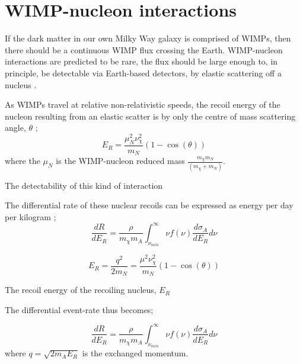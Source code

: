 \section{WIMP-nucleon interactions} \label{sec:wimp_nucleus_interactions}
\par
If the dark matter in our own Milky Way galaxy is comprised of WIMPs, then there should be a continuous WIMP flux crossing the Earth.
WIMP-nucleon interactions are predicted to be rare, the flux should be large enough to, in principle, be detectable via Earth-based detectors, by elastic scattering off a nucleus \cite{wimp_nucleon_interactions_first_suggestion_ref,supersymmetric_dark_matter_ref}.

As WIMPs travel at relative non-relativistic speeds, the recoil energy of the nucleon resulting from an elastic scatter is by only the centre of mass scattering angle, $\theta$ \cite{direct_detection_of_wimps_ref};
\begin{equation}
    E_{R} = \frac{{\mu}_{N}^{2}\nu_{\chi}^2}{m_{N}}(1-\cos(\theta))
\end{equation}
where the $\mu_N$ is the WIMP-nucleon reduced mass $\frac{m_\chi m_N}{(m_\chi + m_N)}$.

\par
The detectability of this kind of interaction
\par
The differential rate of these nuclear recoils can be expressed as energy per day per kilogram \cite{direct_detection_of_wimps_ref};
\begin{equation}
    \frac{dR}{dE_{R}} = \frac{\rho}{m_{\chi}m_{A}} \int_{\nu_{min}}^{\infty} \nu f(\nu) \frac{d\sigma_{A}}{dE_{R}} d\nu
\end{equation}


\begin{equation}
    E_{R} = \frac{q^{2}}{2m_{N}} = \frac{\mu^2\nu_{\chi}^2}{m_{N}}(1-\cos(\theta))
\end{equation}

The recoil energy of the recoiling nucleus, $E_{R}$




\par
The differential event-rate thus becomes;

\begin{equation}
    \frac{dR}{dE_{R}} = \frac{\rho}{m_{\chi}m_{A}} \int_{\nu_{min}}^{\infty} \nu f(\nu) \frac{d\sigma_{A}}{dE_{R}} d\nu
\end{equation}
where $q=\sqrt{2{m}_{A}E_{R}}$ is the exchanged momentum.


